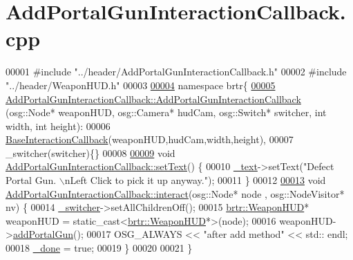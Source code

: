 \hypertarget{_add_portal_gun_interaction_callback_8cpp_source}{\section{Add\+Portal\+Gun\+Interaction\+Callback.\+cpp}
\label{_add_portal_gun_interaction_callback_8cpp_source}
}

\begin{DoxyCode}
00001 \textcolor{preprocessor}{#include "../header/AddPortalGunInteractionCallback.h"}
00002 \textcolor{preprocessor}{#include "../header/WeaponHUD.h"}
00003 
\hypertarget{_add_portal_gun_interaction_callback_8cpp_source_l00004}{}\hyperlink{namespacebrtr}{00004} \textcolor{keyword}{namespace }brtr\{
\hypertarget{_add_portal_gun_interaction_callback_8cpp_source_l00005}{}\hyperlink{classbrtr_1_1_add_portal_gun_interaction_callback_a849f25b53c2a3c81e8201777bf481c96}{00005}     \hyperlink{classbrtr_1_1_add_portal_gun_interaction_callback_a849f25b53c2a3c81e8201777bf481c96}{AddPortalGunInteractionCallback::AddPortalGunInteractionCallback}
      (osg::Node* weaponHUD, osg::Camera* hudCam, osg::Switch* switcher, \textcolor{keywordtype}{int} width, \textcolor{keywordtype}{int} height):
00006     \hyperlink{classbrtr_1_1_base_interaction_callback}{BaseInteractionCallback}(weaponHUD,hudCam,width,height),
00007     \_switcher(switcher)\{\}
00008 
\hypertarget{_add_portal_gun_interaction_callback_8cpp_source_l00009}{}\hyperlink{classbrtr_1_1_add_portal_gun_interaction_callback_aa0db50622c7ae1cd25f8554c916137db}{00009}     \textcolor{keywordtype}{void} \hyperlink{classbrtr_1_1_add_portal_gun_interaction_callback_aa0db50622c7ae1cd25f8554c916137db}{AddPortalGunInteractionCallback::setText}() \{
00010         \hyperlink{classbrtr_1_1_base_interaction_callback_af60dece4300b09fafe3c048397122cbd}{\_text}->setText(\textcolor{stringliteral}{"Defect Portal Gun. \(\backslash\)nLeft Click to pick it up anyway."});
00011     \}
00012 
\hypertarget{_add_portal_gun_interaction_callback_8cpp_source_l00013}{}\hyperlink{classbrtr_1_1_add_portal_gun_interaction_callback_a9b6571b0295f7e12425b57ff0262dbd4}{00013}     \textcolor{keywordtype}{void} \hyperlink{classbrtr_1_1_add_portal_gun_interaction_callback_a9b6571b0295f7e12425b57ff0262dbd4}{AddPortalGunInteractionCallback::interact}(osg::Node* node
      , osg::NodeVisitor* nv) \{
00014         \hyperlink{classbrtr_1_1_add_portal_gun_interaction_callback_ac110a98cbe720e599b344d9940702597}{\_switcher}->setAllChildrenOff();
00015         \hyperlink{classbrtr_1_1_weapon_h_u_d}{brtr::WeaponHUD}* weaponHUD = \textcolor{keyword}{static\_cast<}\hyperlink{classbrtr_1_1_weapon_h_u_d}{brtr::WeaponHUD}*\textcolor{keyword}{>}(node);
00016         weaponHUD->\hyperlink{classbrtr_1_1_weapon_h_u_d_ab8ccf2821f698af567b7ce40eb6840d8}{addPortalGun}();
00017         OSG\_ALWAYS << \textcolor{stringliteral}{"after add method"} << std:: endl;
00018         \hyperlink{classbrtr_1_1_base_interaction_callback_a2f36052886ec60a227e0734bfbc4bdbb}{\_done} = \textcolor{keyword}{true};
00019     \}
00020 
00021 \}
\end{DoxyCode}
